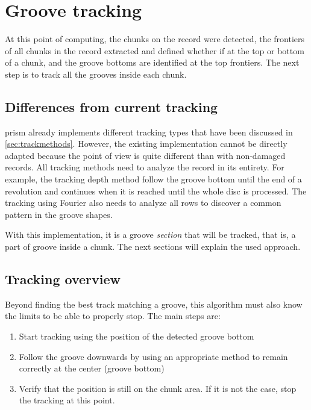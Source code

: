 \section{Groove tracking}
\label{sec:groovetracking}

At this point of computing, the chunks on the record were detected, the frontiers of all chunks in the record extracted and defined whether if at the top or bottom of a chunk, and the groove bottoms are identified at the top frontiers. The next step is to track all the grooves inside each chunk.

\subsection{Differences from current tracking}

\gls{prism} already implements different tracking types that have been discussed in \autoref{sec:trackmethods}. However, the existing implementation cannot be directly adapted because the point of view is quite different than with non-damaged records. All tracking methods need to analyze the record in its entirety. For example, the tracking depth method follow the groove bottom until the end of a revolution and continues when it is reached until the whole disc is processed. The tracking using Fourier also needs to analyze all rows to discover a common pattern in the groove shapes.

With this implementation, it is a groove \emph{section} that will be tracked, that is, a part of groove inside a chunk. The next sections will explain the used approach.

\subsection{Tracking overview}

Beyond finding the best track matching a groove, this algorithm must also know the limits to be able to properly stop. The main steps are:

\begin{enumerate}
\item Start tracking using the position of the detected groove bottom
\item Follow the groove downwards by using an appropriate method to remain correctly at the center (groove bottom)
\item Verify that the position is still on the chunk area. If it is not the case, stop the tracking at this point.
\end{enumerate}

